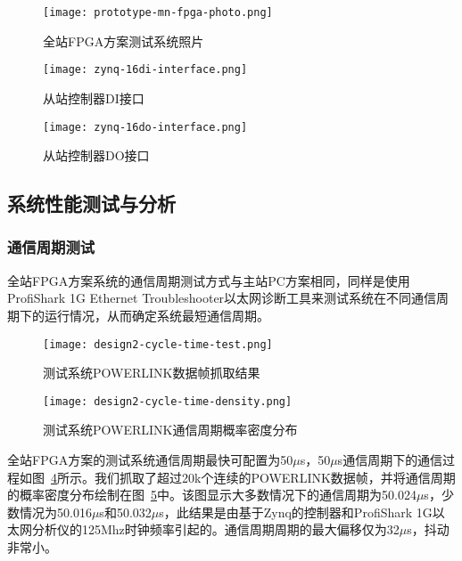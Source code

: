 \begin{figure}[htbp]
  \centering
  \texttt{[image: prototype-mn-fpga-photo.png]}
  \caption{全站FPGA方案测试系统照片}
  \label{fig:prototype-mn-fpga-photo}
\end{figure}

\begin{figure}[htbp]
  \centering
  \texttt{[image: zynq-16di-interface.png]}
  \caption{从站控制器DI接口}
  \label{fig:zynq-16di-interface}
\end{figure}

\begin{figure}[htbp]
  \centering
  \texttt{[image: zynq-16do-interface.png]}
  \caption{从站控制器DO接口}
  \label{fig:zynq-16do-interface}
\end{figure}

\subsection{系统性能测试与分析}
\label{subsection:系统性能测试与分析}

\subsubsection{通信周期测试}
\label{subsection:系统通信周期测试}
全站FPGA方案系统的通信周期测试方式与主站PC方案相同，同样是使用ProfiShark 1G Ethernet Troubleshooter以太网诊断工具来测试系统在不同通信周期下的运行情况，从而确定系统最短通信周期。

\begin{figure}[!htb]
  \centering
  \texttt{[image: design2-cycle-time-test.png]}
  \caption{测试系统POWERLINK数据帧抓取结果}
  \label{fig:design2-cycle-time-test}
\end{figure}

\begin{figure}[!htb]
  \centering
  \texttt{[image: design2-cycle-time-density.png]}
  \caption{测试系统POWERLINK通信周期概率密度分布}
  \label{fig:design2-cycle-time-density}
\end{figure}

全站FPGA方案的测试系统通信周期最快可配置为50$\mu$s，50$\mu$s通信周期下的通信过程如图~\ref{fig:design2-cycle-time-test}所示。我们抓取了超过20k个连续的POWERLINK数据帧，并将通信周期的概率密度分布绘制在图~\ref{fig:design2-cycle-time-density}中。该图显示大多数情况下的通信周期为50.024$\mu$s，少数情况为50.016$\mu$s和50.032$\mu$s，此结果是由基于Zynq的控制器和ProfiShark 1G以太网分析仪的125Mhz时钟频率引起的。通信周期周期的最大偏移仅为32$\mu$s，抖动非常小。

